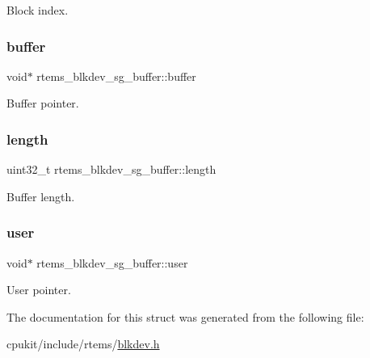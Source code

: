 Block index. \mbox{\label{structrtems__blkdev__sg__buffer_a7ade07e731b6633a7788d5c4cec39622}} 
\subsubsection{\texorpdfstring{buffer}{buffer}}
{\footnotesize\ttfamily void$\ast$ rtems\+\_\+blkdev\+\_\+sg\+\_\+buffer\+::buffer}

Buffer pointer. \mbox{\label{structrtems__blkdev__sg__buffer_a8c03b562d75f1af31e765c9df9db2555}} 
\subsubsection{\texorpdfstring{length}{length}}
{\footnotesize\ttfamily uint32\+\_\+t rtems\+\_\+blkdev\+\_\+sg\+\_\+buffer\+::length}

Buffer length. \mbox{\label{structrtems__blkdev__sg__buffer_ab7fd935b734a4a9d3beb5d7f16937da1}} 
\subsubsection{\texorpdfstring{user}{user}}
{\footnotesize\ttfamily void$\ast$ rtems\+\_\+blkdev\+\_\+sg\+\_\+buffer\+::user}

User pointer. 

The documentation for this struct was generated from the following file\+:\begin{DoxyCompactItemize}
\item 
cpukit/include/rtems/\mbox{\hyperlink{blkdev_8h}{blkdev.\+h}}\end{DoxyCompactItemize}
